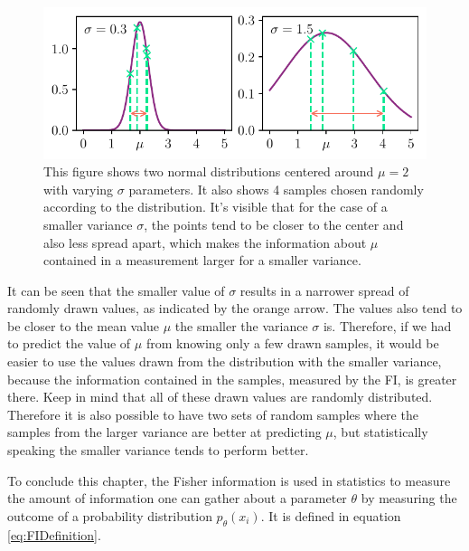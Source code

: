 \begin{figure}
	\centering
	\includegraphics{"text/FisherInformation/plots/NormalDistributionPlot.pdf"}
	\caption{This figure shows two normal distributions centered around $\mu = 2$ with varying $\sigma$ parameters. It also shows 4 samples chosen randomly according to the distribution. It's visible that for the case of a smaller variance $\sigma$, the points tend to be closer to the center and also less spread apart, which makes the information about $\mu$ contained in a measurement larger for a smaller variance.}
	\label{fig:NormalDistributionExample}
\end{figure}
It can be seen that the smaller value of $\sigma$ results in a narrower spread of randomly drawn values, as indicated by the orange arrow. The values also tend to be closer to the mean value $\mu$ the smaller the variance $\sigma$ is. Therefore, if we had to predict the value of $\mu$ from knowing only a few drawn samples, it would be easier to use the values drawn from the distribution with the smaller variance, because the information contained in the samples, measured by the FI, is greater there. Keep in mind that all of these drawn values are randomly distributed. Therefore it is also possible to have two sets of random samples where the samples from the larger variance are better at predicting $\mu$, but statistically speaking the smaller variance tends to perform better.

To conclude this chapter, the Fisher information is used in statistics to measure the amount of information one can gather about a parameter $\theta$ by measuring the outcome of a probability distribution $p_\theta(x_i)$. It is defined in equation \cref{eq:FIDefinition}.
